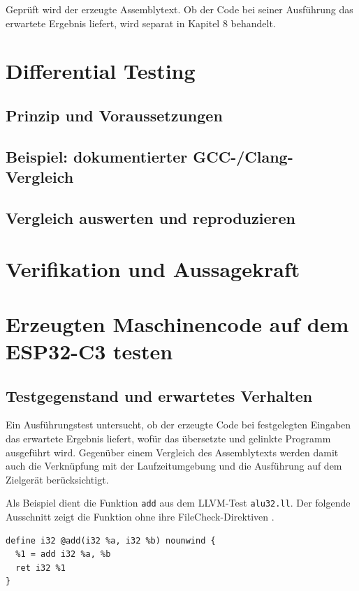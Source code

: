 \documentclass[11pt,a4paper]{article}
\newcommand{\code}[1]{\texttt{#1}}
\begin{document}
Geprüft wird der erzeugte Assemblytext. Ob der Code bei seiner
Ausführung das erwartete Ergebnis liefert, wird separat in
Kapitel 8 behandelt.

\section{Differential Testing}
\subsection{Prinzip und Voraussetzungen}

\subsection{Beispiel: dokumentierter GCC-/Clang-Vergleich}

\subsection{Vergleich auswerten und reproduzieren}


\section{Verifikation und Aussagekraft}

\section{Erzeugten Maschinencode auf dem ESP32-C3 testen}

\subsection{Testgegenstand und erwartetes Verhalten}
Ein Ausführungstest untersucht, ob der erzeugte Code bei festgelegten
Eingaben das erwartete Ergebnis liefert, wofür das übersetzte
und gelinkte Programm ausgeführt wird. Gegenüber einem Vergleich des
Assemblytexts werden damit auch die Verknüpfung mit der Laufzeitumgebung
und die Ausführung auf dem Zielgerät berücksichtigt.

Als Beispiel dient die Funktion \code{add} aus dem LLVM-Test
\code{alu32.ll}. Der folgende Ausschnitt zeigt die Funktion ohne
ihre FileCheck-Direktiven \cite{rvtest}.

\par\noindent\begin{minipage}{\linewidth}
\begin{lstlisting}[caption={IR-Funktion aus alu32.ll, FileCheck-Direktiven weggelassen}]
define i32 @add(i32 %a, i32 %b) nounwind {
  %1 = add i32 %a, %b
  ret i32 %1
}
\end{lstlisting}
\end{minipage}\par
\end{document}
